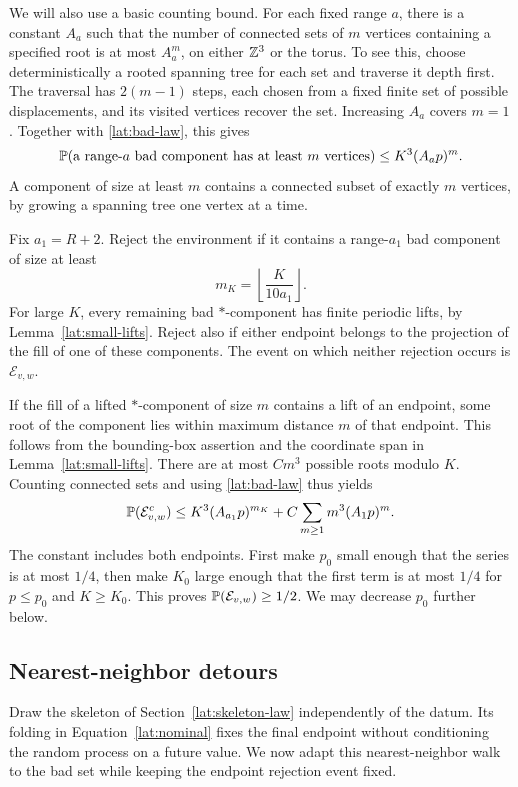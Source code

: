 We will also use a basic counting bound.  For each fixed range $a$, there
is a constant $A_a$ such that the number of connected sets of $m$ vertices
containing a specified root is at most $A_a^m$, on either $\mathbb Z^3$ or the
torus.  To see this, choose deterministically a rooted spanning tree for
each set and traverse it depth first.  The traversal has $2(m-1)$ steps,
each chosen from a fixed finite set of possible displacements, and its
visited vertices recover the set.  Increasing $A_a$ covers $m=1$.
Together with \eqref{lat:bad-law}, this gives
\begin{equation}\label{lat:large-animal}
 \mathbb P(\text{a range-$a$ bad component has at least }m\text{ vertices})
       \le K^3(A_ap)^m.
\end{equation}
A component of size at least $m$ contains a connected subset of exactly
$m$ vertices, by growing a spanning tree one vertex at a time.

Fix $a_1=R+2$.  Reject the environment if it contains a range-$a_1$
bad component of size at least
\[
 m_K=\left\lfloor\frac{K}{10a_1}\right\rfloor.
\]
For large $K$, every remaining bad $*$-component has finite periodic
lifts, by Lemma~\ref{lat:small-lifts}.  Reject also if either endpoint
belongs to the projection of the fill of one of these components.
The event on which neither rejection occurs is $\mathcal E_{v,w}$.

If the fill of a lifted $*$-component of size $m$ contains a lift of
an endpoint, some root of the component lies within maximum distance
$m$ of that endpoint.  This follows from the bounding-box assertion
and the coordinate span in Lemma~\ref{lat:small-lifts}.  There are at
most $C m^3$ possible roots modulo $K$.  Counting connected sets and
using \eqref{lat:bad-law} thus yields
\begin{equation}\label{lat:rejection}
 \mathbb P(\mathcal E_{v,w}^{c})
 \le K^3(A_{a_1}p)^{m_K}
       +C\sum_{m\ge1}m^3(A_1p)^m.
\end{equation}
The constant includes both endpoints.  First make $p_0$ small enough
that the series is at most $1/4$, then make $K_0$ large enough that
the first term is at most $1/4$ for $p\le p_0$ and $K\ge K_0$.
This proves $\mathbb P(\mathcal E_{v,w})\ge1/2$.  We may decrease $p_0$
further below.

\subsection{Nearest-neighbor detours}

Draw the skeleton of Section~\ref{lat:skeleton-law} independently of the
datum. Its folding in Equation~\eqref{lat:nominal} fixes the final endpoint
without conditioning the random process on a future value. We now adapt
this nearest-neighbor walk to the bad set while keeping the endpoint
rejection event fixed.

